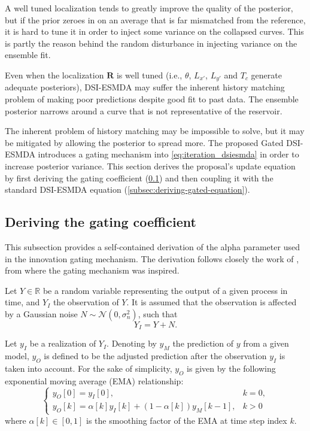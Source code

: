 A well tuned localization tends to greatly improve the quality of the posterior, 
but if the prior zeroes in on an average that is far mismatched from the reference,
it is hard to tune it in order to inject some variance on the collapsed curves.
This is partly the reason behind the random disturbance in injecting variance on the ensemble fit.

Even when the localization $\mathbf{R}$ is well tuned (i.e., $\theta$, $L_{x'}$, $L_{y'}$ and $T_c$ generate adequate posteriors), 
DSI-ESMDA may suffer the inherent history matching problem of making poor predictions despite good fit to past data.
%
The ensemble posterior narrows around a curve that is not representative of the reservoir.

The inherent problem of history matching may be impossible to solve, but it may be mitigated by allowing the posterior to spread more.
The proposed Gated DSI-ESMDA introduces a gating mechanism into \cref{eq:iteration_dsiesmda}
in order to increase posterior variance.
%
This section derives the proposal's update equation by 
first deriving the gating coefficient (\cref{subsec:deriving-alpha})
and then coupling it with the standard DSI-ESMDA equation (\cref{subsec:deriving-gated-equation}).

\subsection{Deriving the gating coefficient}
\label{subsec:deriving-alpha}

This subsection provides a self-contained derivation of the alpha parameter 
used in the innovation gating mechanism. 
The derivation follows closely the work of , 
from where the gating mechanism was inspired.

Let $Y \in \mathbb{R}$ be a random variable representing the output of a given process in time, and $Y_I$ the observation of $Y$.
It is assumed that the observation is affected by a Gaussian noise $N \sim \mathcal{N}(0, \sigma_n^2)$, such that
%
\begin{equation}
    Y_I = Y + N.
\end{equation}

Let $y_I$ be a realization of $Y_I$.
Denoting by $y_M$ the prediction of $y$ from a given model, 
$y_O$ is defined to be the adjusted prediction after the observation $y_I$ is taken into account.
For the sake of simplicity, $y_O$ is given by the following exponential moving average (EMA) relationship:
%
\begin{equation}
    \begin{cases}
        y_O[0] = y_I[0], & k = 0, \\
        y_O[k] = \alpha[k] y_I[k] + (1 - \alpha[k]) y_M[k-1], & k > 0
    \end{cases}
\end{equation}
%
where $\alpha[k] \in [0, 1]$ is the smoothing factor of the EMA at time step index $k$.


